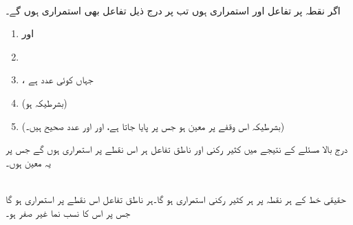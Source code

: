 \\
اگر نقطہ  پر تفاعل  اور  استمراری ہوں تب  پر درج ذیل تفاعل بھی استمراری ہوں گے۔
\begin{enumerate}[1.]
\item
{} اور 
\item
{}
\item
{}، جہاں  کوئی عدد ہے
\item
{} (بشرطیکہ  ہو)
\item
{} (بشرطیکہ  اس وقفے پر معین ہو جس پر  پایا جاتا ہے، اور   اور  عدد صحیح ہیں۔)
\end{enumerate}

درج بالا مسئلے کے نتیجے میں کثیر رکنی اور ناطق تفاعل ہر اس نقطے پر استمراری ہوں گے جس پر یہ معین ہوں۔

\\
حقیقی خط کے ہر نقطہ پر ہر کثیر رکنی استمراری ہو گا۔ہر ناطق تفاعل اس نقطے پر استمراری ہو گا جس پر اس کا نسب نما غیر صفر ہو۔ 

